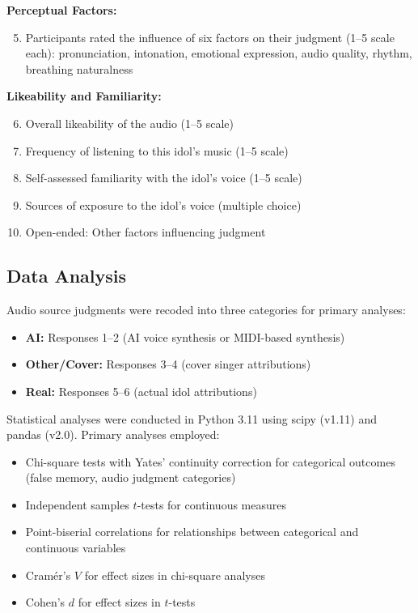 \documentclass[12pt, a4paper]{article}
\begin{document}
\textbf{Perceptual Factors:}
\begin{enumerate}
    \setcounter{enumi}{4}
    \item Participants rated the influence of six factors on their judgment (1--5 scale each): pronunciation, intonation, emotional expression, audio quality, rhythm, breathing naturalness
\end{enumerate}

\textbf{Likeability and Familiarity:}
\begin{enumerate}
    \setcounter{enumi}{5}
    \item Overall likeability of the audio (1--5 scale)
    \item Frequency of listening to this idol's music (1--5 scale)
    \item Self-assessed familiarity with the idol's voice (1--5 scale)
    \item Sources of exposure to the idol's voice (multiple choice)
    \item Open-ended: Other factors influencing judgment
\end{enumerate}

\subsection{Data Analysis}

Audio source judgments were recoded into three categories for primary analyses:
\begin{itemize}
    \item \textbf{AI:} Responses 1--2 (AI voice synthesis or MIDI-based synthesis)
    \item \textbf{Other/Cover:} Responses 3--4 (cover singer attributions)
    \item \textbf{Real:} Responses 5--6 (actual idol attributions)
\end{itemize}

Statistical analyses were conducted in Python 3.11 using scipy (v1.11) and pandas (v2.0). Primary analyses employed:
\begin{itemize}
    \item Chi-square tests with Yates' continuity correction for categorical outcomes (false memory, audio judgment categories)
    \item Independent samples $t$-tests for continuous measures
    \item Point-biserial correlations for relationships between categorical and continuous variables
    \item Cramér's $V$ for effect sizes in chi-square analyses
    \item Cohen's $d$ for effect sizes in $t$-tests
\end{itemize}
\end{document}
